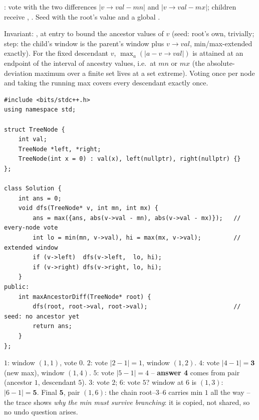 : vote with the two differences $|v\to\mathit{val}-\mathit{mn}|$
and $|v\to\mathit{val}-\mathit{mx}|$; children receive
, . Seed with the root's value and
a global .

\begin{proofbox}
Invariant: ,  at entry to  bound the ancestor
values of $v$ (seed: root's own, trivially; step: the child's window is the
parent's window plus $v\to\mathit{val}$, min/max-extended exactly). For the fixed
descendant $v$, $\max_{a}( |a - v\to\mathit{val}| )$ is attained at an endpoint
of the interval of ancestry values, i.e.\ at $\mathit{mn}$ or $\mathit{mx}$
(the absolute-deviation maximum over a finite set lives at a set extreme).
Voting once per node and taking the running max covers every descendant
exactly once.
\end{proofbox}

\begin{lstlisting}[caption={Node--Ancestor Max Difference (LeetCode 1026)}, label={lst:c02-anc-diff}]
#include <bits/stdc++.h>
using namespace std;

struct TreeNode {
    int val;
    TreeNode *left, *right;
    TreeNode(int x = 0) : val(x), left(nullptr), right(nullptr) {}
};

class Solution {
    int ans = 0;
    void dfs(TreeNode* v, int mn, int mx) {
        ans = max({ans, abs(v->val - mn), abs(v->val - mx)});   // every-node vote
        int lo = min(mn, v->val), hi = max(mx, v->val);         // extended window
        if (v->left)  dfs(v->left,  lo, hi);
        if (v->right) dfs(v->right, lo, hi);
    }
public:
    int maxAncestorDiff(TreeNode* root) {
        dfs(root, root->val, root->val);                        // seed: no ancestor yet
        return ans;
    }
};
\end{lstlisting}

\begin{tracebox}[On $R$]
$1$: window $(1,1)$, vote $0$. $2$: vote $|2-1| = 1$, window $(1,2)$.
$4$: vote $|4-1| = \mathbf{3}$ (new max), window $(1,4)$. $5$: vote
$|5-1| = 4$ -- \textbf{answer 4} comes from pair (ancestor $1$, descendant $5$).
$3$: vote $2$; $6$: vote $5$? window at $6$ is $(1,3)$: $|6-1| = \mathbf{5}$.
Final $\mathbf{5}$, pair $(1,6)$: the chain root--$3$--$6$ carries min $1$ all
the way -- the trace shows \emph{why the min must survive branching}: it is
copied, not shared, so no undo question arises.
\end{tracebox}

